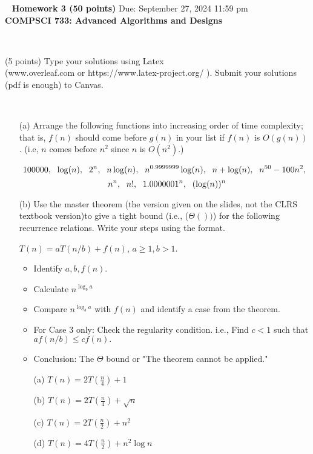 \documentclass[12pt]{article}
\newcommand{\vs}{\vspace{2mm}}
\newcommand{\ls}{\vspace{5mm}}
\newcommand{\bc}{\begin{center}}
\newcommand{\ec}{\end{center}}
\newcommand{\ha}{\hspace{1mm}}
\begin{document}
\bc\ { \bf  Homework  3 (50 points)}  Due: September 27, 2024 11:59 pm\\

 { \bf COMPSCI 733: Advanced Algorithms and Designs } \ec\ 
\ls\

 (5 points)
Type your solutions using Latex \\
(www.overleaf.com or https://www.latex-project.org/ ). Submit your solutions (pdf is enough)  to Canvas. 




\vs\


\begin{itemize}

\item[(a)]
Arrange the following functions into increasing order of time complexity; that is, $f(n)$ should come before $g(n)$ in your list if $f(n)$ is $O(g(n))$. (i.e, $n$ comes before $n^2$ since $n$ is $O(n^2)$.)
\vs\

\[100000 , \ha\ \log(n) ,   \ha\  2^n  , \ha\    n \log(n), \ha\   n^{0.9999999} \log(n) , \ha\  n+ \log(n),   \ha\   n^{50} - 100n^2,  \] 
\[ \ha\    n^n  , \ha\  n! , \ha\ 1.0000001^n, \ha\ (\log(n))^n\]

\item[(b)] Use the master theorem (the version given on the slides, not the CLRS textbook version)to give a tight bound (i.e., ($\Theta())$)  for the following recurrence relations. Write your steps using the format.
 
 $T(n)= aT(n/b)+f(n)$, $a \geq 1, b >1$.

\begin{itemize}
    \item Identify $a, b, f(n)$.
    \item Calculate $n^{\log_ba}$
    \item Compare $n^{\log_ba}$ with $f(n)$ and identify a case from the theorem.
    \item For Case 3 only: Check the regularity condition. i.e., Find $c<1$ such that $af(n/b) \leq c f(n).$
    \item Conclusion:  The $\Theta$ bound or "The theorem cannot be applied."
    
\end{itemize}

\begin{itemize}
    \item[(a)] $T(n) = 2 T(\frac{n}{4}) +1 $
    \item[(b)] $T(n) = 2 T(\frac{n}{4}) + \sqrt{n} $
     \item[(c)] $T(n) = 2 T(\frac{n}{2}) +n^2 $
      \item[(d)] $T(n) = 4T(\frac{n}{2}) + n^{2} \log n $
\end{itemize}    


\end{itemize}
\end{document}
